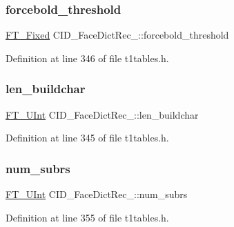 \subsubsection{\texorpdfstring{forcebold\_threshold}{forcebold\_threshold}}
{\footnotesize\ttfamily \mbox{\hyperlink{fttypes_8h_a5f5a679cc09f758efdd0d1c5feed3c3d}{F\+T\+\_\+\+Fixed}} C\+I\+D\+\_\+\+Face\+Dict\+Rec\+\_\+\+::forcebold\+\_\+threshold}



Definition at line 346 of file t1tables.\+h.

\mbox{\label{struct_c_i_d___face_dict_rec___aec468e2ef1159dd49d33ff3560e8d15b}} 
\subsubsection{\texorpdfstring{len\_buildchar}{len\_buildchar}}
{\footnotesize\ttfamily \mbox{\hyperlink{fttypes_8h_abcb8db4dbf35d2b55a9e8c7b0926dc52}{F\+T\+\_\+\+U\+Int}} C\+I\+D\+\_\+\+Face\+Dict\+Rec\+\_\+\+::len\+\_\+buildchar}



Definition at line 345 of file t1tables.\+h.

\mbox{\label{struct_c_i_d___face_dict_rec___a611c406c8d7cd2e37d077070f4bb3ebe}} 
\subsubsection{\texorpdfstring{num\_subrs}{num\_subrs}}
{\footnotesize\ttfamily \mbox{\hyperlink{fttypes_8h_abcb8db4dbf35d2b55a9e8c7b0926dc52}{F\+T\+\_\+\+U\+Int}} C\+I\+D\+\_\+\+Face\+Dict\+Rec\+\_\+\+::num\+\_\+subrs}



Definition at line 355 of file t1tables.\+h.

\mbox{\label{struct_c_i_d___face_dict_rec___a77e70cc8a5eba8e6a0f6a3a3e2e8d50c}} 
